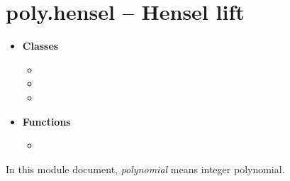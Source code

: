 

 \section{poly.hensel -- Hensel lift}
 \begin{itemize}
   \item {\bf Classes}
   \begin{itemize}
     \item \negok {}
     \item \negok {}
     \item \negok {}
   \end{itemize}
   \item {\bf Functions}
     \begin{itemize}
       \item {}
     \end{itemize}
 \end{itemize}

 In this module document, {\em polynomial} means integer polynomial.
\C

